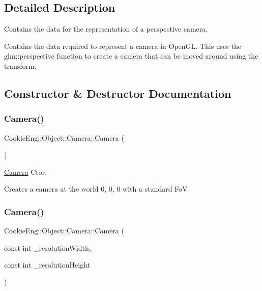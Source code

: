 \subsection{Detailed Description}
Contains the data for the representation of a perspective camera. 

Contains the data required to represent a camera in Open\+GL. This uses the glm\+::perspective function to create a camera that can be moved around using the transform. 

\subsection{Constructor \& Destructor Documentation}
\mbox{\label{class_cookie_eng_1_1_object_1_1_camera_aa98f73385bfef2dd29f3763dd6a7549c}} 
\subsubsection{\texorpdfstring{Camera()}{Camera()}\hspace{0.1cm}{\footnotesize\ttfamily [1/2]}}
{\footnotesize\ttfamily Cookie\+Eng\+::\+Object\+::\+Camera\+::\+Camera (\begin{DoxyParamCaption}{ }\end{DoxyParamCaption})}



\hyperlink{class_cookie_eng_1_1_object_1_1_camera}{Camera} Ctor. 

Creates a camera at the world 0, 0, 0 with a standard FoV \mbox{\label{class_cookie_eng_1_1_object_1_1_camera_ae11d9131d0dddff4e6ab545e0b09657c}} 
\subsubsection{\texorpdfstring{Camera()}{Camera()}\hspace{0.1cm}{\footnotesize\ttfamily [2/2]}}
{\footnotesize\ttfamily Cookie\+Eng\+::\+Object\+::\+Camera\+::\+Camera (\begin{DoxyParamCaption}\item[{const int}]{\+\_\+resolution\+Width,  }\item[{const int}]{\+\_\+resolution\+Height }\end{DoxyParamCaption})}



